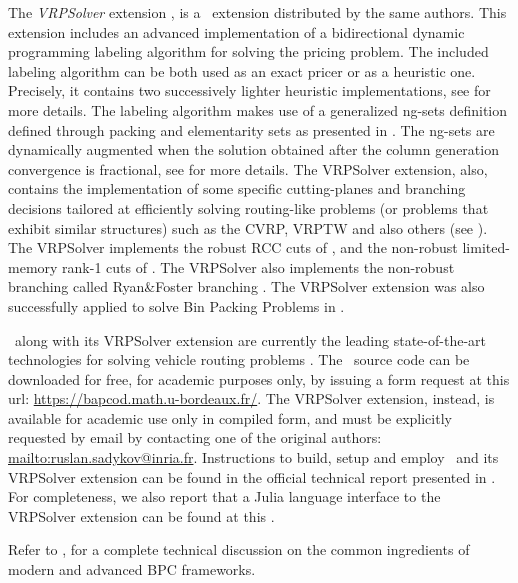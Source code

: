 The \textit{VRPSolver} extension \parencite{pessoa2020generic}, is
a \bapcod\ extension distributed by the same authors.
This extension includes an
advanced implementation of a bidirectional dynamic programming labeling algorithm
\parencite{sadykov2021bucket} for solving the pricing problem.
The included labeling algorithm
can be both used as an exact pricer or as a heuristic one.
Precisely, it contains two successively lighter heuristic implementations,
see \textcite{sadykov2021bucket} for more details.
The labeling algorithm makes use of a generalized ng-sets definition \parencite{baldacci2011}
defined through packing and elementarity sets as presented in \textcite{pessoa2020generic}.
The ng-sets are dynamically augmented \parencite{roberti2014}
when the solution obtained after the column generation convergence
is fractional,
see \textcite{pessoa2020generic} for more details.
The VRPSolver extension, also,
contains the implementation of some
specific cutting-planes and branching decisions
tailored at efficiently solving routing-like problems
(or problems that exhibit similar structures)
such as the CVRP, VRPTW and also others (see \cite{pessoa2020generic}).
The VRPSolver implements the robust RCC cuts of \textcite{laporte1983},
and the non-robust limited-memory rank-1 cuts of \textcite{pecin2017improved}.
The VRPSolver also implements the non-robust branching called Ryan\&Foster branching \parencite{ryan1981integer}.
The VRPSolver extension was also successfully applied
to solve Bin Packing Problems in \textcite{pessoa2020}.

\medskip

\bapcod\ along with its VRPSolver extension are currently the leading state-of-the-art
technologies for solving vehicle routing problems \parencite{pessoa2020generic}.
The \bapcod\ source code can be downloaded for free, for academic purposes only,
by issuing a form request at this url: \url{https://bapcod.math.u-bordeaux.fr/}.
The VRPSolver extension, instead, is available for academic use only in compiled form,
and must be explicitly requested by email by contacting one of the
original authors: \url{mailto:ruslan.sadykov@inria.fr}.
Instructions to build, setup and employ \bapcod\ and its VRPSolver extension
can be found in the official technical report presented in \textcite{sadykov2021}.
For completeness, we also report that
a Julia language interface to the VRPSolver extension
can be found at this
.

Refer to \textcite{sadykov2019modern},
for a complete technical discussion on the common ingredients of modern and advanced BPC frameworks.

